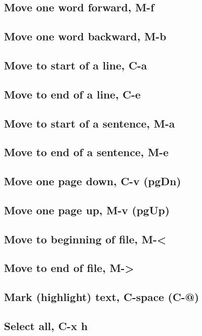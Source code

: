\documentclass[11pt]{article}
\begin{document}
\subsection{Move one word forward, M-f}
\label{sec:orge165386}
\subsection{Move one word backward, M-b}
\label{sec:org209c57d}
\subsection{Move to start of a line, C-a}
\label{sec:orgf040a6f}
\subsection{Move to end of a line, C-e}
\label{sec:org9d4be90}
\subsection{Move to start of a sentence, M-a}
\label{sec:org7b16fd3}
\subsection{Move to end of a sentence, M-e}
\label{sec:orgc9a7f13}
\subsection{Move one page down, C-v (pgDn)}
\label{sec:org559431f}
\subsection{Move one page up, M-v (pgUp)}
\label{sec:orgd1ba80c}
\subsection{Move to beginning of file, M-<}
\label{sec:orgf44f197}
\subsection{Move to end of file, M->}
\label{sec:org7bc1909}
\subsection{Mark (highlight) text, C-space (C-@)}
\label{sec:org8c1153f}
\subsection{Select all, C-x h}
\label{sec:orgf0d1a75}
\end{document}
